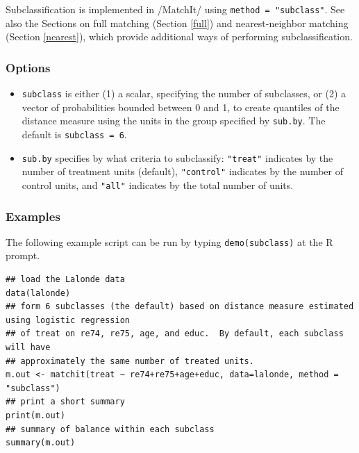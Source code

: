 \documentclass[oneside,letterpaper,titlepage]{article}
\begin{document}
Subclassification is implemented in /MatchIt/ using \texttt{method =
  "subclass"}.  See also the Sections on full matching (Section
\ref{full}) and nearest-neighbor matching (Section \ref{nearest}),
which provide additional ways of performing subclassification.

\subsubsection{Options}

\begin{itemize}
\item \texttt{subclass} is either (1) a scalar, specifying the number
  of subclasses, or (2) a vector of probabilities bounded between 0
  and 1, to create quantiles of the distance measure using the units
  in the group specified by \texttt{sub.by}.  The default is
  \texttt{subclass = 6}.
\item \texttt{sub.by} specifies by what criteria to subclassify:
  \texttt{"treat"} indicates by the number of treatment units
  (default), \texttt{"control"} indicates by the number of control
  units, and \texttt{"all"} indicates by the total number of units.
  \end{itemize}

\subsubsection{Examples}

The following example script can be run by typing {\tt demo(subclass)}
at the R prompt.

\begin{verbatim}
## load the Lalonde data
data(lalonde)
## form 6 subclasses (the default) based on distance measure estimated using logistic regression
## of treat on re74, re75, age, and educ.  By default, each subclass will have
## approximately the same number of treated units. 
m.out <- matchit(treat ~ re74+re75+age+educ, data=lalonde, method = "subclass")
## print a short summary
print(m.out)
## summary of balance within each subclass
summary(m.out)
\end{verbatim}
\end{document}
